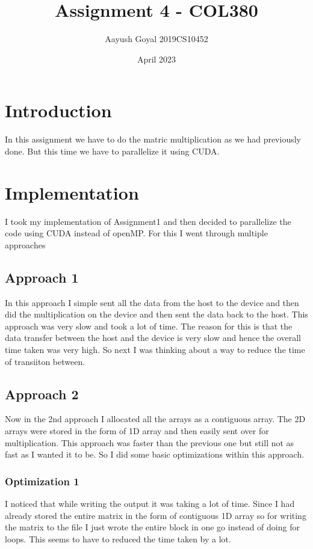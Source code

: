 \documentclass{article}
\title{Assignment 4 - COL380}
\author{Aayush Goyal 2019CS10452}
\date{April 2023}
\begin{document}
\maketitle

\tableofcontents

\section{Introduction}
In this assignment we have to do the matric multiplication as we had previously done. But this time we have to parallelize it using CUDA. 

\section{Implementation}

I took my implementation of Assignment1 and then decided to parallelize the code using CUDA instead of openMP. For this I went through multiple approaches 

\subsection{Approach 1}
In this approach I simple sent all the data from the host to the device and then did the multiplication on the device and then sent the data back to the host. This approach was very slow and took a lot of time. The reason for this is that the data transfer between the host and the device is very slow and hence the overall time taken was very high. So next I was thinking about a way to reduce the time of transiiton between.

\subsection{Approach 2}

Now in the 2nd approach I allocated all the arrays as a contiguous array. The 2D arrays were stored in the form of 1D array and then easily sent over for multiplication. This approach was faster than the previous one but still not as fast as I wanted it to be. So I did some basic optimizations within this approach.

\subsubsection{Optimization 1}
I noticed that while writing the output it was taking a lot of time. Since I had already stored the entire matrix in the form of contiguous 1D array so for writing the matrix to the file I just wrote the entire block in one go instead of doing for loops. This seems to have to reduced the time taken by a lot.
\end{document}
